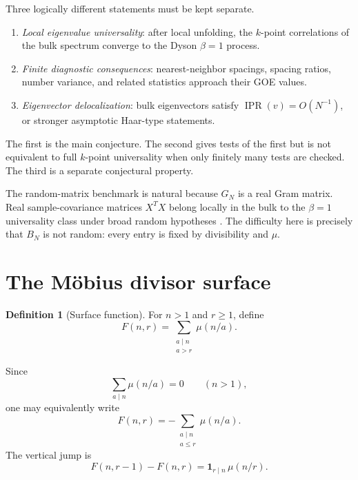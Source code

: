 \documentclass[11pt]{amsart}
\numberwithin{equation}{section}
\theoremstyle{plain}
\theoremstyle{definition}
\newtheorem{definition}[theorem]{Definition}
\theoremstyle{remark}
\newcommand{\mob}{\mu}
\newcommand{\IPR}{\operatorname{IPR}}
\begin{document}
Three logically different statements must be kept separate.

\begin{enumerate}[label=(\roman*)]
\item \emph{Local eigenvalue universality}: after local unfolding, the $k$-point correlations of the bulk spectrum converge to the Dyson $\beta=1$ process.
\item \emph{Finite diagnostic consequences}: nearest-neighbor spacings, spacing ratios, number variance, and related statistics approach their GOE values.
\item \emph{Eigenvector delocalization}: bulk eigenvectors satisfy $\IPR(v)=O(N^{-1})$, or stronger asymptotic Haar-type statements.
\end{enumerate}

The first is the main conjecture.  The second gives tests of the first but is not equivalent to full $k$-point universality when only finitely many tests are checked.  The third is a separate conjectural property.

The random-matrix benchmark is natural because $G_N$ is a real Gram matrix.  Real sample-covariance matrices $X^TX$ belong locally in the bulk to the $\beta=1$ universality class under broad random hypotheses \cite{TaoVu2012,PillaiYin2014}.  The difficulty here is precisely that $B_N$ is not random: every entry is fixed by divisibility and $\mob$.

\section{The M\"obius divisor surface}
\label{sec:mobius_surface}

\begin{definition}[Surface function]
\label{def:surface_function}
For $n>1$ and $r\ge1$, define
\begin{equation}
F(n,r)=\sum_{\substack{a\mid n\\a>r}}\mob(n/a).
\label{eq:surface_definition}
\end{equation}
\end{definition}

Since
\begin{equation}
\sum_{a\mid n}\mob(n/a)=0
\qquad(n>1),
\label{eq:mobius_divisor_zero}
\end{equation}
one may equivalently write
\begin{equation}
F(n,r)=-\sum_{\substack{a\mid n\\a\le r}}\mob(n/a).
\label{eq:surface_prefix_form}
\end{equation}
The vertical jump is
\begin{equation}
F(n,r-1)-F(n,r)=\mathbf 1_{r\mid n}\,\mob(n/r).
\label{eq:vertical_jump}
\end{equation}
\end{document}
